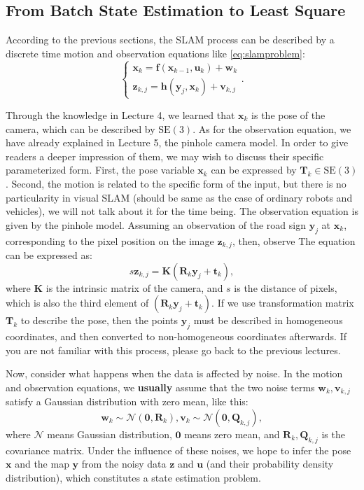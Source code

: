 \subsection{From Batch State Estimation to Least Square}
According to the previous sections, the SLAM process can be described by a discrete time motion and observation equations like \eqref{eq:slamproblem}:
\begin{equation}
\left\{ \begin{array}{l}
{\bm{x}_k} = \mathbf{f}\left( {{\bm{x}_{k - 1}},{\bm{u}_k}} \right) + \bm{w}_k\\
{\bm{z}_{k,j}} = \mathbf{h}\left( {{ \bm{y}_j},{ \bm{x}_k}}  \right)+ \bm{v}_{k,j}
\end{array} \right. .
\end{equation}

Through the knowledge in Lecture 4, we learned that $ \bm {x} _k $ is the pose of the camera, which can be described by $ \mathrm {SE} (3) $. As for the observation equation, we have already explained in Lecture 5, the pinhole camera model. In order to give readers a deeper impression of them, we may wish to discuss their specific parameterized form. First, the pose variable $\bm {x} _k $ can be expressed by $\bm {T} _k \in \mathrm {SE} (3) $. Second, the motion is related to the specific form of the input, but there is no particularity in visual SLAM (should be same as the case of ordinary robots and vehicles), we will not talk about it for the time being. The observation equation is given by the pinhole model. Assuming an observation of the road sign $ \bm {y} _j $ at $ \bm {x} _k $, corresponding to the pixel position on the image $ \bm {z} _ {k, j} $, then, observe The equation can be expressed as:
\begin{equation}
s \bm{z}_{k,j}= \bm{K} (\bm{R}_k {\bm{y}_j}+\bm{t}_k),
\end{equation}
where $ \bm {K} $ is the intrinsic matrix of the camera, and $s$ is the distance of pixels, which is also the third element of $ (\bm {R} _k {\bm {y} _j} + \bm {t} _k) $. If we use  transformation matrix $ \bm {T} _k $ to describe the pose, then the points $ \bm {y} _j $ must be described in homogeneous coordinates, and then converted to non-homogeneous coordinates afterwards. If you are not familiar with this process, please go back to the previous lectures.

Now, consider what happens when the data is affected by noise. In the motion and observation equations, we \textbf {usually} assume that the two noise terms $ \bm {w} _k, \bm {v} _ {k, j} $ satisfy a Gaussian distribution with zero mean, like this:
\begin{equation}
{\bm{w}_k} \sim \mathcal{N}\left( {\bm{0},{\bm{R}_k}} \right),{\bm{v}_k} \sim \mathcal{N}\left( {\bm{0},{{{\bm{Q}}}_{k,j}}} \right),
\end{equation}
where $ \mathcal {N} $ means Gaussian distribution, $ \bm{0} $ means zero mean, and $ \bm {R} _k, \bm {Q} _ {k, j} $ is the covariance matrix. Under the influence of these noises, we hope to infer the pose $ \bm {x} $ and the map $ \bm {y} $ from the noisy data $ \bm {z} $ and $ \bm {u} $ (and their probability density distribution), which constitutes a state estimation problem.

